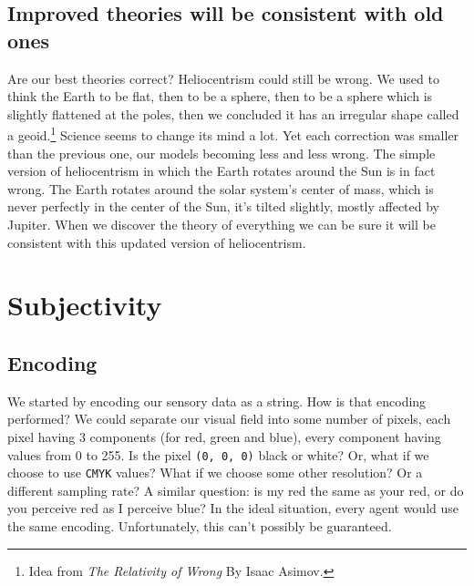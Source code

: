 \newpage

\subsection{Improved theories will be consistent with old ones}

Are our best theories correct?
Heliocentrism could still be wrong.
We used to think the Earth to be flat, then to be a sphere, then to be a sphere which is slightly flattened at the poles, then we concluded it has an irregular shape called a geoid.\footnote{Idea from \textit{The Relativity of Wrong} By Isaac Asimov.}
Science seems to change its mind a lot.
Yet each correction was smaller than the previous one, our models becoming less and less wrong.
The simple version of heliocentrism in which the Earth rotates around the Sun is in fact wrong.
The Earth rotates around the solar system's center of mass, which is never perfectly in the center of the Sun, it's tilted slightly, mostly affected by Jupiter.
When we discover the theory of everything we can be sure it will be consistent with this updated version of heliocentrism.

\newpage

\section{Subjectivity}

\subsection{Encoding}

We started by encoding our sensory data as a string.
How is that encoding performed?
We could separate our visual field into some number of pixels, each pixel having 3 components (for red, green and blue), every component having values from 0 to 255.
Is the pixel \texttt{(0, 0, 0)} black or white?
Or, what if we choose to use \texttt{CMYK} values?
What if we choose some other resolution?
Or a different sampling rate?
A similar question: is my red the same as your red, or do you perceive red as I perceive blue?
In the ideal situation, every agent would use the same encoding.
Unfortunately, this can't possibly be guaranteed.

